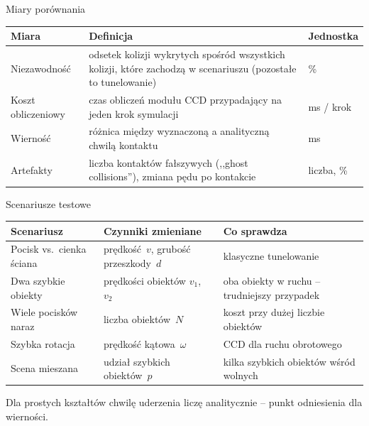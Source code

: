 \documentclass[aspectratio=169, 11pt]{beamer}
\begin{document}
\begin{frame}{Miary porównania}
  \small
  \renewcommand{\arraystretch}{1.35}
  \begin{tabular}{@{}l>{\raggedright\arraybackslash}p{}l@{}}
    \toprule
    \textbf{Miara} & \textbf{Definicja} & \textbf{Jednostka} \\
    \midrule
    Niezawodność & odsetek kolizji wykrytych spośród wszystkich kolizji, które zachodzą w scenariuszu (pozostałe to tunelowanie) & \% \\
    Koszt obliczeniowy & czas obliczeń modułu CCD przypadający na jeden krok symulacji & ms / krok \\
    Wierność & różnica między wyznaczoną a analityczną chwilą kontaktu & ms \\
    Artefakty & liczba kontaktów fałszywych (,,ghost collisions''), zmiana pędu po kontakcie & liczba, \% \\
    \bottomrule
  \end{tabular}
\end{frame}
 
\begin{frame}{Scenariusze testowe}
  \renewcommand{\arraystretch}{1.3}
  \begin{tabular}{@{}l>{\raggedright\arraybackslash}p{}>{\raggedright\arraybackslash}p{}@{}}
    \toprule
    \textbf{Scenariusz} & \textbf{Czynniki zmieniane} & \textbf{Co sprawdza} \\
    \midrule
    Pocisk vs.\ cienka ściana & prędkość~$v$, grubość przeszkody~$d$ & klasyczne tunelowanie \\
    Dwa szybkie obiekty & prędkości obiektów $v_1$,~$v_2$ & oba obiekty w ruchu -- trudniejszy przypadek \\
    Wiele pocisków naraz & liczba obiektów~$N$ & koszt przy dużej liczbie obiektów \\
    Szybka rotacja & prędkość kątowa~$\omega$ & CCD dla ruchu obrotowego \\
    Scena mieszana & udział szybkich obiektów~$p$ & kilka szybkich obiektów wśród wolnych \\
    \bottomrule
  \end{tabular}
  \vspace{0.3cm}
 
  {\small\color{SlateGray} Dla prostych kształtów chwilę uderzenia liczę analitycznie -- punkt odniesienia dla wierności.}
\end{frame}
 
\end{document}
